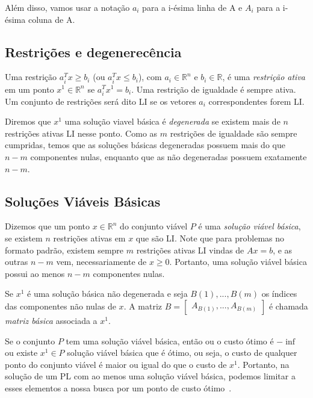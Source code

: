 \documentclass[12pt]{article}
\begin{document}
	Além disso, vamos usar a notação $a_i$ para a i-ésima linha de A e $A_i$ para a i-ésima coluna de A.
    
    
\subsection{Restrições e degenerecência}
	Uma restrição $a^{T}_{i}x \geq b_{i}$ (ou $a^{T}_{i}x \leq b_{i}$), com $a_{i} \in \mathbb{R}^{n}$ e $b_i \in \mathbb{R}$, é uma \emph{restrição ativa} em um ponto $x^1 \in \mathbb{R}^n$ se $a^{T}_{i}x^1 = b_i$. Uma restrição de igualdade é sempre ativa. Um conjunto de restrições será dito LI se os vetores $a_{i}$ correspondentes forem LI.
    
    Diremos que $x^1$ uma solução viavel básica é \emph{degenerada} se existem mais de $n$ restrições ativas LI nesse ponto. Como as $m$ restrições de igualdade são sempre cumpridas, temos que as soluções básicas degeneradas possuem mais do que $n - m$ componentes nulas, enquanto que as não degeneradas possuem exatamente $n - m$.
    
    
\subsection{Soluções Viáveis Básicas}
	\label{subsec:svb}
    Dizemos que um ponto $x \in \mathbb{R}^{n}$ do conjunto viável $P$ é uma \emph{solução viável básica}, se existem $n$ restrições ativas em $x$ que são LI. Note que para problemas no formato padrão, existem sempre $m$ restrições ativas LI vindas de $Ax = b$, e as outras $n - m$ vem, necessariamente de $x \geq 0$. Portanto, uma solução viável básica possui ao menos $n - m$ componentes nulas.
    
    Se $x^1$ é uma solução básica não degenerada e seja $B(1), ..., B(m)$ os índices das componentes não nulas de $x$. A matriz $B = \begin{bmatrix} A_{B(1)}, ..., A_{B(m)}\end{bmatrix}$ é chamada \emph{matriz básica} associada a $x^1$.
    
    Se o conjunto $P$ tem uma solução viável básica, então ou o custo ótimo é $- \inf$ ou existe $x^1 \in P$ solução viável básica que é ótimo, ou seja, o custo de qualquer ponto do conjunto viável é maior ou igual do que o custo de $x^1$. Portanto, na solução de um PL com ao menos uma solução viável básica, podemos limitar a esses elementos a nossa busca por um ponto de custo ótimo~\cite{315book}.
    
\end{document}
